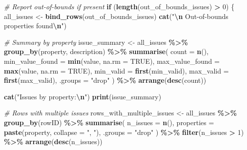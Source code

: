 \documentclass[
  10pt,
  b5paper,
  oneside]{book}
\newenvironment{Shaded}{\begin{snugshade}}{\end{snugshade}}
\newcommand{\AttributeTok}[1]{\textcolor[rgb]{0.13,0.29,0.53}{#1}}
\newcommand{\CommentTok}[1]{\textcolor[rgb]{0.56,0.35,0.01}{\textit{#1}}}
\newcommand{\ConstantTok}[1]{\textcolor[rgb]{0.56,0.35,0.01}{#1}}
\newcommand{\ControlFlowTok}[1]{\textcolor[rgb]{0.13,0.29,0.53}{\textbf{#1}}}
\newcommand{\DecValTok}[1]{\textcolor[rgb]{0.00,0.00,0.81}{#1}}
\newcommand{\FunctionTok}[1]{\textcolor[rgb]{0.13,0.29,0.53}{\textbf{#1}}}
\newcommand{\NormalTok}[1]{#1}
\newcommand{\OtherTok}[1]{\textcolor[rgb]{0.56,0.35,0.01}{#1}}
\newcommand{\SpecialCharTok}[1]{\textcolor[rgb]{0.81,0.36,0.00}{\textbf{#1}}}
\newcommand{\StringTok}[1]{\textcolor[rgb]{0.31,0.60,0.02}{#1}}
\begin{document}
\begin{Shaded}
\begin{Highlighting}[]
\CommentTok{\# Report out{-}of{-}bounds if present}
\ControlFlowTok{if}\NormalTok{ (}\FunctionTok{length}\NormalTok{(out\_of\_bounds\_issues) }\SpecialCharTok{\textgreater{}} \DecValTok{0}\NormalTok{) \{}
\NormalTok{  all\_issues }\OtherTok{\textless{}{-}} \FunctionTok{bind\_rows}\NormalTok{(out\_of\_bounds\_issues)}
  \FunctionTok{cat}\NormalTok{(}\StringTok{"}\SpecialCharTok{\textbackslash{}n}\StringTok{ Out{-}of{-}bounds properties found}\SpecialCharTok{\textbackslash{}n}\StringTok{"}\NormalTok{)}

  \CommentTok{\# Summary by property}
\NormalTok{  issue\_summary }\OtherTok{\textless{}{-}}\NormalTok{ all\_issues }\SpecialCharTok{\%\textgreater{}\%}
    \FunctionTok{group\_by}\NormalTok{(property, description) }\SpecialCharTok{\%\textgreater{}\%}
    \FunctionTok{summarise}\NormalTok{(}
      \AttributeTok{count =} \FunctionTok{n}\NormalTok{(),}
      \AttributeTok{min\_value\_found =} \FunctionTok{min}\NormalTok{(value, }\AttributeTok{na.rm =} \ConstantTok{TRUE}\NormalTok{),}
      \AttributeTok{max\_value\_found =} \FunctionTok{max}\NormalTok{(value, }\AttributeTok{na.rm =} \ConstantTok{TRUE}\NormalTok{),}
      \AttributeTok{min\_valid =} \FunctionTok{first}\NormalTok{(min\_valid),}
      \AttributeTok{max\_valid =} \FunctionTok{first}\NormalTok{(max\_valid),}
      \AttributeTok{.groups =} \StringTok{"drop"}
\NormalTok{    ) }\SpecialCharTok{\%\textgreater{}\%}
    \FunctionTok{arrange}\NormalTok{(}\FunctionTok{desc}\NormalTok{(count))}
  
  \FunctionTok{cat}\NormalTok{(}\StringTok{"Issues by property:}\SpecialCharTok{\textbackslash{}n}\StringTok{"}\NormalTok{)}
  \FunctionTok{print}\NormalTok{(issue\_summary)}
  
  \CommentTok{\# Rows with multiple issues}
\NormalTok{  rows\_with\_multiple\_issues }\OtherTok{\textless{}{-}}\NormalTok{ all\_issues }\SpecialCharTok{\%\textgreater{}\%}
    \FunctionTok{group\_by}\NormalTok{(rowID) }\SpecialCharTok{\%\textgreater{}\%}
    \FunctionTok{summarise}\NormalTok{(}
      \AttributeTok{n\_issues =} \FunctionTok{n}\NormalTok{(),}
      \AttributeTok{properties =} \FunctionTok{paste}\NormalTok{(property, }\AttributeTok{collapse =} \StringTok{", "}\NormalTok{),}
      \AttributeTok{.groups =} \StringTok{"drop"}
\NormalTok{    ) }\SpecialCharTok{\%\textgreater{}\%}
    \FunctionTok{filter}\NormalTok{(n\_issues }\SpecialCharTok{\textgreater{}} \DecValTok{1}\NormalTok{) }\SpecialCharTok{\%\textgreater{}\%}
    \FunctionTok{arrange}\NormalTok{(}\FunctionTok{desc}\NormalTok{(n\_issues))}
  

\end{Highlighting}
\end{Shaded}
\end{document}
